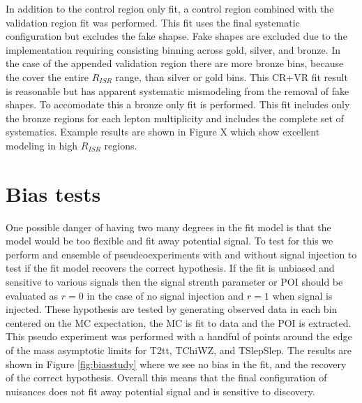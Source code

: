 


In addition to the control region only fit, a control region combined with the validation region fit was performed. This fit uses the final systematic configuration but excludes the fake shapse. Fake shapes are excluded due to the implementation requiring consisting binning across gold, silver, and bronze. In the case of the appended validation region there are more bronze bins, because the cover the entire $R_{ISR}$ range, than silver or gold bins. This CR+VR fit result is reasonable but has apparent systematic mismodeling from the removal of fake shapes.  To accomodate this a bronze only fit is performed. This fit includes only the bronze regions for each lepton multiplicity and includes the complete set of systematics. Example results are shown in Figure X which show excellent modeling in high $R_{ISR}$ regions.

\section{Bias tests}

One possible danger of having two many degrees in the fit model is that the model would be too flexible and fit away potential signal. To test for this we perform and ensemble of pseudeoexperiments with and without signal injection to test if the fit model recovers the correct hypothesis.  If the fit is unbiased and sensitive to various signals then the signal strenth parameter or POI should be evaluated as $r=0$ in the case of no signal injection and $r=1$ when signal is injected.  These hypothesis are tested by generating observed data in each bin centered on the MC expectation, the MC is fit to data and the POI is extracted. This pseudo experiment was performed with a handful of points around the edge of the mass asymptotic limits for T2tt, TChiWZ, and TSlepSlep. The results are shown in Figure \ref{fig:biasstudy} where we see no bias in the fit, and the recovery of the correct hypothesis. Overall this means that the final configuration of nuisances does not fit away potential signal and is sensitive to discovery.

